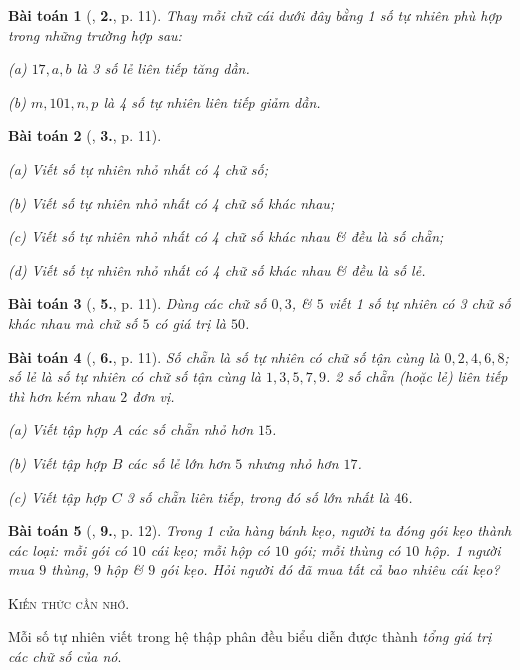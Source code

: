 \documentclass{article}
\numberwithin{equation}{section}
\newtheorem{baitoan}{Bài toán}[section]
\begin{document}
\begin{baitoan}[\cite{Trong_Toan_6_2021}, \textbf{2.}, p. 11]
	Thay mỗi chữ cái dưới đây bằng 1 số tự nhiên phù hợp trong những trường hợp sau:
	\begin{enumerate*}
		\item[(a)] $17,a,b$ là 3 số lẻ liên tiếp tăng dần.
		\item[(b)] $m,101,n,p$ là 4 số tự nhiên liên tiếp giảm dần.
	\end{enumerate*}
\end{baitoan}

\begin{baitoan}[\cite{Trong_Toan_6_2021}, \textbf{3.}, p. 11]
	\begin{enumerate*}
		\item[(a)] Viết số tự nhiên nhỏ nhất có 4 chữ số;
		\item[(b)] Viết số tự nhiên nhỏ nhất có 4 chữ số khác nhau;
		\item[(c)] Viết số tự nhiên nhỏ nhất có 4 chữ số khác nhau \& đều là số chẵn;
		\item[(d)] Viết số tự nhiên nhỏ nhất có 4 chữ số khác nhau \& đều là số lẻ.
	\end{enumerate*}
\end{baitoan}

\begin{baitoan}[\cite{Trong_Toan_6_2021}, \textbf{5.}, p. 11]
	Dùng các chữ số $0,3$, \& $5$ viết 1 số tự nhiên có 3 chữ số khác nhau mà chữ số $5$ có giá trị là $50$.
\end{baitoan}

\begin{baitoan}[\cite{Trong_Toan_6_2021}, \textbf{6.}, p. 11]
	\emph{Số chẵn} là số tự nhiên có chữ số tận cùng là $0,2,4,6,8$; \emph{số lẻ} là số tự nhiên có chữ số tận cùng là $1,3,5,7,9$. 2 số chẵn (hoặc lẻ) \emph{liên tiếp} thì hơn kém nhau $2$ đơn vị.
	\begin{enumerate*}
		\item[(a)] Viết tập hợp $A$ các số chẵn nhỏ hơn $15$.
		\item[(b)] Viết tập hợp $B$ các số lẻ lớn hơn $5$ nhưng nhỏ hơn $17$.
		\item[(c)] Viết tập hợp $C$ 3 số chẵn liên tiếp, trong đó số lớn nhất là $46$.
	\end{enumerate*}
\end{baitoan}

\begin{baitoan}[\cite{Trong_Toan_6_2021}, \textbf{9.}, p. 12]
	Trong 1 cửa hàng bánh kẹo, người ta đóng gói kẹo thành các loại: mỗi gói có $10$ cái kẹo; mỗi hộp có $10$ gói; mỗi thùng có $10$ hộp. 1 người mua $9$ thùng, $9$ hộp \& $9$ gói kẹo. Hỏi người đó đã mua tất cả bao nhiêu cái kẹo?
\end{baitoan}
\noindent\textsc{Kiến thức cần nhớ.}
\begin{tcolorbox}
	Mỗi số tự nhiên viết trong hệ thập phân đều biểu diễn được thành \textit{tổng giá trị các chữ số của nó}. 
\end{tcolorbox}
\end{document}
